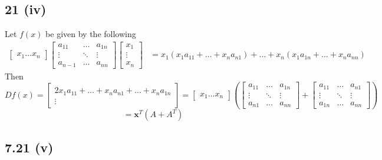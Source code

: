 \documentclass[letterpaper,12pt]{article}
\theoremstyle{definition}
\begin{document}
\subsection*{21 (iv)}

Let $f(x)$ be given by the following
\begin{align*}
\begin{bmatrix} x_1  \dots x_n \end{bmatrix}
\begin{bmatrix}
a_{11}&\dots&a_{1n}\\
\vdots&\ddots&\vdots\\
a_{n-1}&\dots&a_{nn}
\end{bmatrix}
\begin{bmatrix}x_1\\ 
\vdots\\ 
x_n\end{bmatrix}
&=x_1(x_1a_{11}+\dots+x_n a_{n1})+\dots+x_n( x_1 a_{1n}+\dots+x_na_{nn})
\end{align*}
Then
\[Df(x) = \begin{bmatrix}
2x_1a_{11}+\dots+x_n a_{n1}+\dots+x_n a_{1n}\\
\vdots\end{bmatrix}=
\begin{bmatrix}
x_1 \dots x_n
\end{bmatrix}
\left(\begin{bmatrix}
a_{11}&\dots&a_{1n}\\
\vdots&\ddots&\vdots\\
a_{n1}&\dots&a_{nn}
\end{bmatrix}+\begin{bmatrix}
a_{11}&\dots&a_{n1}\\
\vdots&\ddots&\vdots\\
a_{1n}&\dots&a_{nn}
\end{bmatrix}\right)\]
\[=\textbf{x}^T(A+A^T)\]

\subsection*{7.21 (v)}
\end{document}

